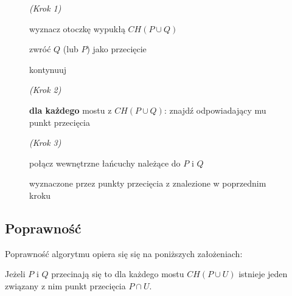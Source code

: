 \begin{figure}[htp]
\begin{algorithmic}[1]

\State \emph{(Krok 1)}

\State wyznacz otoczkę wypukłą $CH(P \cup Q)$

\State

    \State zwróć $Q$ (lub $P$) jako przecięcie

    \Else
    \State kontynuuj
\EndIf

\State

\State \emph{(Krok 2)}

\State \textbf{dla każdego} mostu z $CH(P \cup Q)$:
\State \hspace{\algorithmicindent} znajdź odpowiadający mu punkt
przecięcia

\State

\State \emph{(Krok 3)}

\State połącz wewnętrzne łańcuchy należące do $P$ i $Q$

wyznaczone przez punkty przecięcia z znalezione w poprzednim kroku

\EndProcedure
\end{algorithmic}
\caption{\label{alg:interconpol}}
\end{figure}


\subsection{Poprawność}
Poprawność algorytmu opiera się się na poniższych założeniach:

\begin{lemat}
  Jeżeli $P$ i $Q$ przecinają się to dla każdego mostu $CH(P \cup U)$
  istnieje jeden związany z nim punkt przecięcia $P \cap U$.
\end{lemat}

